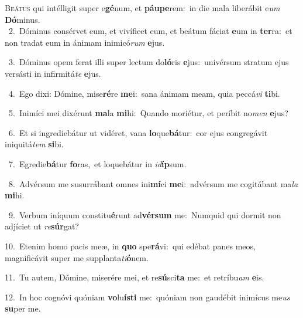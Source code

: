 \lettrine{\initial\textcolor{\initialcolor}{B}}{eátus} qui intélligit super e\-\textbf{gé}\-num, et \textbf{páu}\-\textbf{pe}rem:~\star in die mala liberábit e\textit{um} \textbf{Dó}\-minus.\\
{\numbfont\textcolor{\numbcolor}{~2.}}~Dóminus consérvet eum, et vivíficet eum, et beátum fáciat \textbf{e}\-um in \textbf{ter}\-ra:~\star et non tradat eum in ánimam inimicó\textit{rum} \textbf{e}\-jus.\par
{\numbfont\textcolor{\numbcolor}{~3.}}~Dóminus opem ferat illi super lectum do\-\textbf{ló}\-ris \textbf{e}\-jus:~\star univérsum stratum ejus versásti in infirmitá\textit{te} \textbf{e}\-jus.\par
{\numbfont\textcolor{\numbcolor}{~4.}}~Ego dixi: Dómine, mise\-\textbf{ré}\-re \textbf{me}\-i:~\star sana ánimam meam, quia peccá\textit{vi} \textbf{ti}\-bi.\par
{\numbfont\textcolor{\numbcolor}{~5.}}~Inimíci mei dixérunt \textbf{ma}\-la \textbf{mi}\-hi:~\star Quando moriétur, et períbit no\textit{men} \textbf{e}\-jus?\par
{\numbfont\textcolor{\numbcolor}{~6.}}~Et si ingrediebátur ut vidéret, vana \textbf{lo}\-que\-\textbf{bá}\-tur:~\star cor ejus congregávit iniquitá\textit{tem} \textbf{si}\-bi.\par
{\numbfont\textcolor{\numbcolor}{~7.}}~Egredie\-\textbf{bá}\-tur \textbf{fo}\-ras,~\star et loquebátur in \textit{id}\-\textbf{íp}sum.\par
{\numbfont\textcolor{\numbcolor}{~8.}}~Advérsum me susurrábant omnes ini\-\textbf{mí}\-ci \textbf{me}\-i:~\star advérsum me cogitábant ma\textit{la} \textbf{mi}\-hi.\par
{\numbfont\textcolor{\numbcolor}{~9.}}~Verbum iníquum constitu\-\textbf{é}\-runt ad\-\textbf{vér}\-\textbf{sum} me:~\star Numquid qui dormit non adjíciet ut \textit{re}\-\textbf{súr}gat?\par
{\numbfont\textcolor{\numbcolor}{10.}}~Etenim homo pacis meæ, in \textbf{quo} spe\-\textbf{rá}\-vi:~\star qui edébat panes meos, magnificávit super me supplanta\-\textit{ti}\-\textbf{ó}nem.\par
{\numbfont\textcolor{\numbcolor}{11.}}~Tu autem, Dómine, miserére mei, et re\-\textbf{sú}\-sci\textbf{ta} me:~\star et retríbu\textit{am} \textbf{e}\-is.\par
{\numbfont\textcolor{\numbcolor}{12.}}~In hoc cognóvi quóniam \textbf{vo}\-lu\-\textbf{ís}\-\textbf{ti} me:~\star quóniam non gaudébit inimícus me\textit{us} \textbf{su}\-per me.\par
